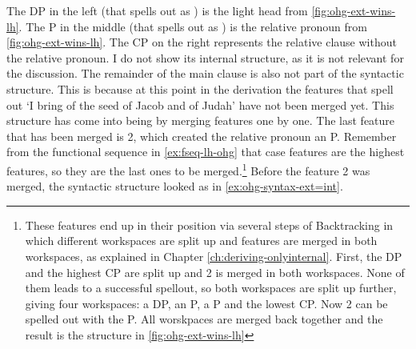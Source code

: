 The DP in the left (that spells out as ) is the light head from \ref{fig:ohg-ext-wins-lh}. The P in the middle (that spells out as ) is the relative pronoun from \ref{fig:ohg-ext-wins-lh}. The CP on the right represents the relative clause without the relative pronoun. I do not show its internal structure, as it is not relevant for the discussion.
The remainder of the main clause is also not part of the syntactic structure. This is because at this point in the derivation the features that spell out  `I bring of the seed of Jacob and of Judah' have not been merged yet. This structure has come into being by merging features one by one. The last feature that has been merged is 2, which created the relative pronoun an P. Remember from the functional sequence in \ref{ex:fseq-lh-ohg} that case features are the highest features, so they are the last ones to be merged.\footnote{
These features end up in their position via several steps of Backtracking in which different workspaces are split up and features are merged in both workspaces, as explained in Chapter \ref{ch:deriving-onlyinternal}. First, the DP and the highest CP are split up and 2 is merged in both workspaces. None of them leads to a successful spellout, so both workspaces are split up further, giving four workspaces: a DP, an P, a P and the lowest CP. Now 2 can be spelled out with the P. All worskpaces are merged back together and the result is the structure in \ref{fig:ohg-ext-wins-lh}
}
Before the feature 2 was merged, the syntactic structure looked as in \ref{ex:ohg-syntax-ext=int}.


